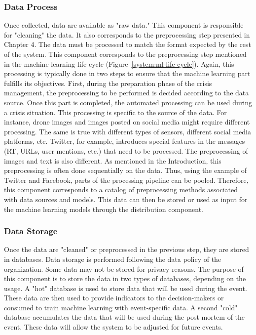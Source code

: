 \subsubsection{Data Process}
Once collected, data are available as "raw data."
This component is responsible for "cleaning" the data.
It also corresponds to the preprocessing step presented in Chapter 4.
The data must be processed to match the format expected by the rest of the system.
This component corresponds to the preprocessing step mentioned in the machine learning life cycle (Figure~\ref{system:ml-life-cycle}).
Again, this processing is typically done in two steps to ensure that the machine learning part fulfills its objectives.
First, during the preparation phase of the crisis management, the preprocessing to be performed is decided according to the data source.
Once this part is completed, the automated processing can be used during a crisis situation.
This processing is specific to the source of the data.
For instance, drone images and images posted on social media might require different processing.
The same is true with different types of sensors, different social media platforms, etc.
Twitter, for example, introduces special features in the messages (RT, URLs, user mentions, etc.) that need to be processed.
The preprocessing of images and text is also different.
As mentioned in the Introduction, this preprocessing is often done sequentially on the data.
Thus, using the example of Twitter and Facebook, parts of the processing pipeline can be pooled.
Therefore, this component corresponds to a catalog of preprocessing methods associated with data sources and models.
This data can then be stored or used as input for the machine learning models through the distribution component.

\subsubsection{Data Storage}
Once the data are "cleaned" or preprocessed in the previous step, they are stored in databases.
Data storage is performed following the data policy of the organization.
Some data may not be stored for privacy reasons.
The purpose of this component is to store the data in two types of databases, depending on the usage.
A "hot" database is used to store data that will be used during the event.
These data are then used to provide indicators to the decision-makers or consumed to train machine learning with event-specific data.
A second "cold" database accumulates the data that will be used during the post mortem of the event.
These data will allow the system to be adjusted for future events.

